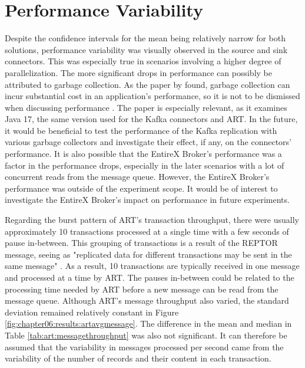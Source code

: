 \section{Performance Variability}
\label{ch07:discussion:performancevariability}
Despite the confidence intervals for the mean being relatively narrow for both solutions, performance variability was visually observed in the source and sink connectors. This was especially true in scenarios involving a higher degree of parallelization. The more significant drops in performance can possibly be attributed to garbage collection. As the paper by \citeauthor{cai2022distillinggc} found, garbage collection can incur substantial cost in an application's performance, so it is not to be dismissed when discussing performance \cite{cai2022distillinggc}. The paper is especially relevant, as it examines Java 17, the same version used for the Kafka connectors and \ac{ART}. In the future, it would be beneficial to test the performance of the Kafka replication with various garbage collectors and investigate their effect, if any, on the connectors' performance. It is also possible that the EntireX Broker's performance was a factor in the performance drops, especially in the later scenarios with a lot of concurrent reads from the message queue. However, the EntireX Broker's performance was outside of the experiment scope. It would be of interest to investigate the EntireX Broker's impact on performance in future experiments.

Regarding the burst pattern of \ac{ART}'s transaction throughput, there were usually approximately 10 transactions processed at a single time with a few seconds of pause in-between. This grouping of transactions is a result of the \ac{REPTOR} message, seeing as "replicated data for different transactions may be sent in the same message" \cite{reptorprogrammersref}. As a result, 10 transactions are typically received in one message and processed at a time by \ac{ART}. The pauses in-between could be related to the processing time needed by \ac{ART} before a new message can be read from the message queue. 
Although \ac{ART}'s message throughput also varied, the standard deviation remained relatively constant in Figure \ref{fig:chapter06:results:artavgmessage}. The difference in the mean and median in Table \ref{tab:art:messagethroughput} was also not significant. It can therefore be assumed that the variability in messages processed per second came from the variability of the number of records and their content in each transaction.

